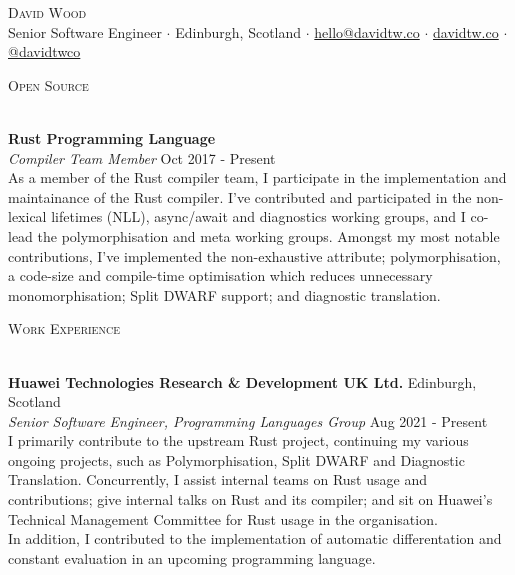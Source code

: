 \documentclass[a4paper]{article}
\newcommand{\lineunder} {
  \vspace*{-8pt} \\
  \hspace*{-18pt} \hrulefill \\
}
\newcommand{\header} [1] {
  {\hspace*{-18pt}\vspace*{6pt} \textsc{#1}}
  \vspace*{-6pt} \lineunder
}
\begin{document}
\fancyhead{}
\renewcommand{\headrulewidth}{0pt}

\fancyfoot{}
\fancyfoot[R]{\scriptsize\scshape\color{gray} \thepage}

\vspace*{-40pt}

\vspace*{-10pt}
\begin{center}
  {\Huge \scshape {David Wood}} \\
  \vspace{1mm}
  Senior Software Engineer $\cdot$
  Edinburgh, Scotland $\cdot$
  \href{mailto:hello@davidtw.co}{hello@davidtw.co} $\cdot$
  \href{https://davidtw.co}{davidtw.co} $\cdot$
  \href{https://github.com/davidtwco}{@davidtwco} \\
\end{center}

\header{Open Source}
\vspace{1mm}

\textbf{Rust Programming Language} \\
\textit{Compiler Team Member} \hfill {\color{gray} Oct 2017 - Present} \\
\vspace{2mm}
As a member of the Rust compiler team, I participate in the implementation and maintainance of the
Rust compiler. I've contributed and participated in the non-lexical lifetimes (NLL), async/await
and diagnostics working groups, and I co-lead the polymorphisation and meta working groups. Amongst
my most notable contributions, I've implemented the non-exhaustive attribute; polymorphisation,
a code-size and compile-time optimisation which reduces unnecessary monomorphisation; Split DWARF
support; and diagnostic translation.
\vspace{2mm}

\header{Work Experience}
\vspace{1mm}

\textbf{Huawei Technologies Research \& Development UK Ltd.} \hfill {\color{gray} Edinburgh, Scotland} \\
\textit{Senior Software Engineer, Programming Languages Group} \hfill {\color{gray} Aug 2021 - Present} \\
\vspace{2mm}
I primarily contribute to the upstream Rust project, continuing my various ongoing projects,
such as Polymorphisation, Split DWARF and Diagnostic Translation. Concurrently, I assist internal
teams on Rust usage and contributions; give internal talks on Rust and its compiler; and sit on
Huawei's Technical Management Committee for Rust usage in the organisation. \\
\vspace{2mm}
In addition, I contributed to the implementation of automatic differentation and constant evaluation
in an upcoming programming language.
\vspace{2mm}
\end{document}
